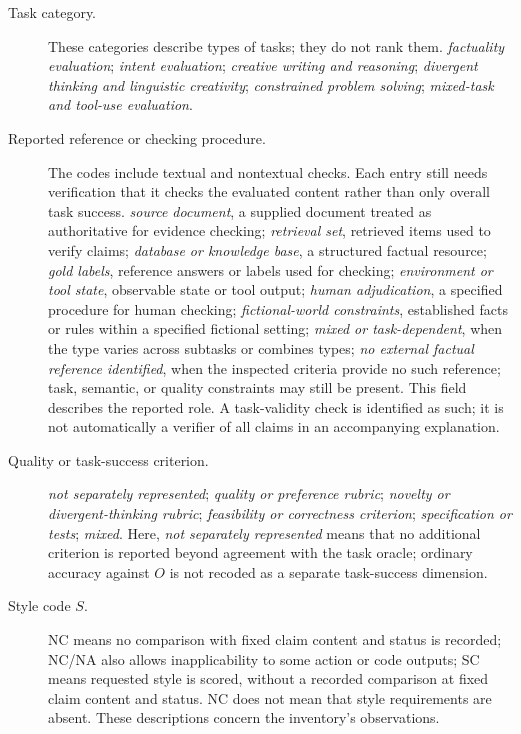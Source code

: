 \documentclass{clv2025}
\begin{document}
\begin{description}
  \item[Task category.]
  These categories describe types of tasks; they do not rank them.
  \emph{factuality evaluation};
  \emph{intent evaluation};
  \emph{creative writing and reasoning};
  \emph{divergent thinking and linguistic creativity};
  \emph{constrained problem solving};
  \emph{mixed-task and tool-use evaluation}.

  \item[Reported reference or checking procedure.]
  The codes include textual and nontextual checks. Each entry still needs
  verification that it checks the evaluated content rather than only overall
  task success.
  \emph{source document}, a supplied document treated as authoritative for
  evidence checking;
  \emph{retrieval set}, retrieved items used to verify claims;
  \emph{database or knowledge base}, a structured factual resource;
  \emph{gold labels}, reference answers or labels used for checking;
  \emph{environment or tool state}, observable state or tool output;
  \emph{human adjudication}, a specified procedure for human checking;
  \emph{fictional-world constraints}, established facts or rules within a
  specified fictional setting;
  \emph{mixed or task-dependent}, when the type varies across subtasks or
  combines types;
  \emph{no external factual reference identified}, when the inspected
  criteria provide no such reference; task, semantic, or quality constraints
  may still be present.
  This field describes the reported role. A task-validity check is
  identified as such; it is not automatically a verifier of all claims in
  an accompanying explanation.

  \item[Quality or task-success criterion.]
  \emph{not separately represented};
  \emph{quality or preference rubric};
  \emph{novelty or divergent-thinking rubric};
  \emph{feasibility or correctness criterion};
  \emph{specification or tests};
  \emph{mixed}.
  Here, \emph{not separately represented} means that no additional criterion
  is reported beyond agreement with the task oracle; ordinary accuracy against
  $O$ is not recoded as a separate task-success dimension.

  \item[Style code $S$.]
  NC means no comparison with fixed claim content and status is recorded;
  NC/NA also allows inapplicability to some action or code outputs;
  SC means requested style is scored, without a recorded comparison at
  fixed claim content and status. NC does not mean that style requirements
  are absent. These descriptions concern the inventory's observations.


\end{description}
\end{document}
